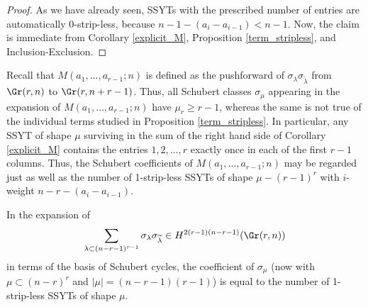 \begin{proof}
As we have already seen, SSYTs with the prescribed number of entries are automatically 0-strip-less, because $n-1-(a_{i}-a_{i-1})<n-1$. Now, the claim is immediate from Corollary \ref{explicit_M}, Proposition \ref{term_stripless}, and Inclusion-Exclusion.
\end{proof}

\begin{rema}\label{degree_shift}
Recall that $M(a_1,\ldots,a_{r-1};n)$ is defined as the pushforward of $\sigma_\lambda\sigma_{\widetilde{\lambda}}$ from $\Gr(r,n)$ to $\Gr(r,n+r-1)$. Thus, all Schubert classes $\sigma_\mu$ appearing in the expansion of $M(a_1,\ldots,a_{r-1};n)$ have $\mu_r\ge r-1$, whereas the same is not true of the individual terms studied in Proposition \ref{term_stripless}. In particular, any SSYT of shape $\mu$ surviving in the sum of the right hand side of Corollary \ref{explicit_M} contains the entries $1,2,\ldots,r$ exactly once in each of the first $r-1$ columns. Thus, the Schubert coefficients of $M(a_1,\ldots,a_{r-1};n)$ may be regarded just as well as the number of 1-strip-less SSYTs of shape $\mu-(r-1)^r$ with $i$-weight $n-r-(a_{i}-a_{i-1})$.
\end{rema}

\begin{coro}\label{pie_all}
In the expansion of 
\begin{equation*}
\sum_{\lambda\subset(n-r-1)^{r-1}}\sigma_{\lambda}\sigma_{\widetilde{\lambda}}\in H^{2(r-1)(n-r-1)}(\Gr(r,n))
\end{equation*}
in terms of the basis of Schubert cycles, the coefficient of $\sigma_\mu$ (now with $\mu\subset(n-r)^{r}$ and $|\mu|=(n-r-1)(r-1)$) is equal to the number of 1-strip-less SSYTs of shape $\mu$.
\end{coro}

